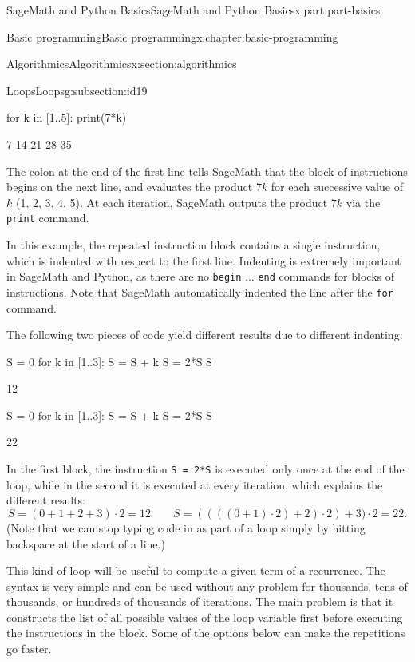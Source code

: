 \documentclass[oneside,10pt,]{book}
\newcommand{\mono}[1]{\texttt{#1}}
\numberwithin{equation}{section}
\begin{document}
\begin{partptx}{SageMath and Python Basics}{}{SageMath and Python Basics}{}{}{x:part:part-basics}
\begin{chapterptx}{Basic programming}{}{Basic programming}{}{}{x:chapter:basic-programming}
\begin{sectionptx}{Algorithmics}{}{Algorithmics}{}{}{x:section:algorithmics}
\begin{subsectionptx}{Loops}{}{Loops}{}{}{g:subsection:id19}
\begin{sageinput}
for k in [1..5]:
	print(7*k)
\end{sageinput}
\begin{sageoutput}
7
14
21
28
35
\end{sageoutput}
The colon at the end of the first line tells SageMath that the block of instructions begins on the next line, and evaluates the product \(7k\) for each successive value of \(k\) (1, 2, 3, 4, 5). At each iteration, SageMath outputs the product \(7k\) via the \mono{print} command.%
\par
In this example, the repeated instruction block contains a single instruction, which is indented with respect to the first line. Indenting is extremely important in SageMath and Python, as there are no \mono{begin} ... \mono{end} commands for blocks of instructions. Note that SageMath automatically indented the line after the \mono{for} command.%
\par
The following two pieces of code yield different results due to different indenting:%
\begin{sageinput}
S = 0
for k in [1..3]:
	S = S + k
S = 2*S
S
\end{sageinput}
\begin{sageoutput}
12
\end{sageoutput}
\begin{sageinput}
S = 0
for k in [1..3]:
	S = S + k
	S = 2*S
S
\end{sageinput}
\begin{sageoutput}
22
\end{sageoutput}
In the first block, the instruction \mono{S = 2*S} is executed only once at the end of the loop, while in the second it is executed at every iteration, which explains the different results:%
\begin{equation*}
S = (0+1+2+3)\cdot 2 = 12 \qquad S = ((((0+1)\cdot 2)+2)\cdot 2) + 3)\cdot 2 = 22.
\end{equation*}
(Note that we can stop typing code in as part of a loop simply by hitting backspace at the start of a line.)%
\par
This kind of loop will be useful to compute a given term of a recurrence.  The syntax is very simple and can be used without any problem for thousands, tens of thousands, or hundreds of thousands of iterations.  The main problem is that it constructs the list of all possible values of the loop variable first before executing the instructions in the block.  Some of the options below can make the repetitions go faster.%
\par

\end{subsectionptx}
\end{sectionptx}
\end{chapterptx}
\end{partptx}
\end{document}

